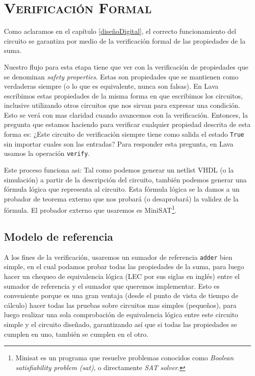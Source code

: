 

\chapter{ \textsc{ Verificación Formal } }\label{verificacion}

Como aclaramos en el capítulo \ref{diseñoDigital}, el correcto funcionamiento del circuito se garantiza por medio de la verificación formal de las propiedades de la suma. 

Nuestro flujo para esta etapa tiene que ver con la verificación de propiedades que se denominan \emph{safety properties}. Estas  son propiedades que se mantienen como verdaderas siempre (o lo que es equivalente, nunca son falsas). En Lava escribimos estas propiedades de la misma forma en que escribimos los circuitos, inclusive utilizando otros circuitos que nos sirvan para expresar una condición. Esto se verá con mas claridad cuando avancemos con la verificación. Entonces, la pregunta que estamos haciendo para verificar cualquier propiedad descrita de esta forma es:  ¿Este circuito de verificación siempre tiene como salida el estado \verb.True. sin importar cuales son las entradas? Para responder esta pregunta, en Lava usamos la operación \verb.verify..

Este proceso funciona asi: Tal como podemos generar un netlist VHDL (o la simulación) a partir de la descripción del circuito, también podemos generar una fórmula lógica que representa al circuito. Esta fórmula lógica se la damos a un probador de teorema externo que nos probará (o desaprobará) la validez de la fórmula. El probador externo que usaremos es MiniSAT\cite{minisat}\footnote{Minisat es un programa que resuelve problemas conocidos como \emph{Boolean satisfiability problem (\gls{sat})}, o directamente \emph{SAT solver}.}.

\section{Modelo de referencia}
A los fines de la verificación, usaremos un sumador de referencia \verb.adder. bien simple, en el cual podamos probar todas las propiedades de la suma, para luego hacer un chequeo de equivalencia lógica (LEC por sus siglas en inglés) entre el sumador de referencia y el sumador que queremos implementar. Esto es conveniente porque es una gran ventaja (desde el punto de vista de tiempo de cálculo) hacer todas las pruebas sobre circuitos mas simples (pequeños), para luego realizar una sola comprobación de equivalencia lógica entre este circuito simple y el circuito diseñado, garantizando así que si todas las propiedades se cumplen en uno, también se cumplen en el otro.

